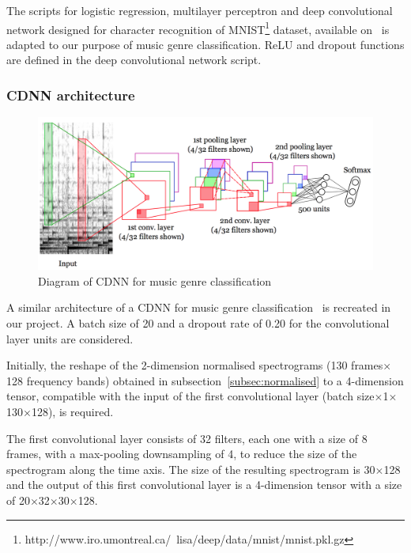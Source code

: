 The scripts for logistic regression, multilayer perceptron and deep convolutional network designed for character recognition of MNIST\footnote{http://www.iro.umontreal.ca/~lisa/deep/data/mnist/mnist.pkl.gz} dataset, available on~\textcite{1_deeplearning.net_2015} is adapted to our purpose of music genre classification. ReLU and dropout functions are defined in the deep convolutional network script.

\subsubsection{CDNN architecture}
\begin{figure}[ht!]
	\centering
	\includegraphics[width=\textwidth]{chapter3/CDNN.png}
	\caption{Diagram of CDNN for music genre classification~\parencite{kereliuk15}}
	\label{fig:cdnn}
\end{figure}
A similar architecture of a CDNN for music genre classification~\parencite{kereliuk15} is recreated in our project. A batch size of 20 and a dropout rate of 0.20 for the convolutional layer units are considered.

Initially, the reshape of the 2-dimension normalised spectrograms (130 frames$\times$128 frequency bands) obtained in subsection~\ref{subsec:normalised} to a 4-dimension tensor, compatible with the input of the first convolutional layer (batch size$\times$1$\times$130$\times$128), is required.

The first convolutional layer consists of 32 filters, each one with a size of 8 frames, with a max-pooling downsampling of 4, to reduce the size of the spectrogram along the time axis. The size of the resulting spectrogram is 30$\times$128 and the output of this first convolutional layer is a 4-dimension tensor with a size of 20$\times$32$\times$30$\times$128.

